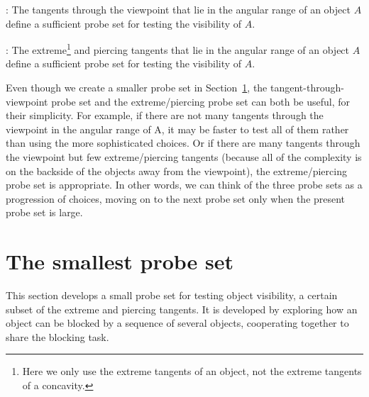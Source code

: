 \documentclass[10pt,twocolumn]{article}
\newif\ifJournal
\begin{document}
: The tangents through 
the viewpoint that lie
in the angular range of an object $A$ define a sufficient probe set for testing the 
visibility of $A$.

: The extreme\footnote{Here we only use the extreme tangents of an object, not the extreme
  tangents of a concavity.}
and piercing tangents that lie in the
angular range of an object $A$ define a sufficient probe set for testing the 
visibility of $A$.

\vspace{.1in}

Even though we create a smaller probe set in Section~\ref{sec:cooperation}, 
the tangent-through-viewpoint probe set
and the extreme/piercing probe set can both be useful, for their simplicity.
For example, if there are not many tangents through the viewpoint in the 
angular range of A, it may be faster to test all of them rather than 
using the more sophisticated choices.
Or if there are many tangents through the viewpoint but few extreme/piercing tangents
(because all of the complexity is on the backside of the objects away from the viewpoint),
the extreme/piercing probe set is appropriate.
In other words, we can think of the three probe sets as a progression of choices,
moving on to the next probe set only when the present probe set is large.

\ifJournal %
Issue to examine in journal paper: 
Testing the visibility of {\em all} objects in the scene: 
since we can share probes, this is not much more expensive than testing the visibility
of a single object.
That is, the observation is that the tangents through the viewpoint and the extreme
and piercing tangents don't change when you consider another object A and its visibility.
\fi

\section{The smallest probe set}
\label{sec:cooperation}

\ifJournal %
Proof that this is the smallest probe set.
Want to incorporate change to PROBE first: choose largest object before A, 
not first object.
\fi

This section develops a small probe set for testing object visibility,
a certain subset of the extreme and piercing tangents.
It is developed by exploring how an object can be blocked by a sequence of several 
objects, cooperating together to share the blocking task.
\end{document}
